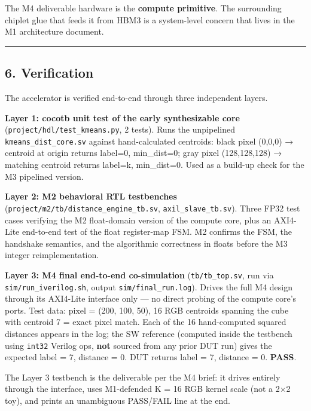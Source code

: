 \documentclass[
  10pt,
]{article}
\begin{document}
The M4 deliverable hardware is the \textbf{compute primitive}. The
surrounding chiplet glue that feeds it from HBM3 is a system-level
concern that lives in the M1 architecture document.

\begin{center}\rule{0.5\linewidth}{0.5pt}\end{center}

\hypertarget{verification}{%
\subsection{6. Verification}\label{verification}}

The accelerator is verified end-to-end through three independent layers.

\textbf{Layer 1: cocotb unit test of the early synthesizable core}
(\texttt{project/hdl/test\_kmeans.py}, 2 tests). Runs the unpipelined
\texttt{kmeans\_dist\_core.sv} against hand-calculated centroids: black
pixel (0,0,0) → centroid at origin returns label=0, min\_dist=0; gray
pixel (128,128,128) → matching centroid returns label=k, min\_dist=0.
Used as a build-up check for the M3 pipelined version.

\textbf{Layer 2: M2 behavioral RTL testbenches}
(\texttt{project/m2/tb/distance\_engine\_tb.sv},
\texttt{axil\_slave\_tb.sv}). Three FP32 test cases verifying the M2
float-domain version of the compute core, plus an AXI4-Lite end-to-end
test of the float register-map FSM. M2 confirms the FSM, the handshake
semantics, and the algorithmic correctness in floats before the M3
integer reimplementation.

\textbf{Layer 3: M4 final end-to-end co-simulation}
(\texttt{tb/tb\_top.sv}, run via \texttt{sim/run\_iverilog.sh}, output
\texttt{sim/final\_run.log}). Drives the full M4 design through its
AXI4-Lite interface only --- no direct probing of the compute core's
ports. Test data: pixel = (200, 100, 50), 16 RGB centroids spanning the
cube with centroid 7 = exact pixel match. Each of the 16 hand-computed
squared distances appears in the log; the SW reference (computed inside
the testbench using \texttt{int32} Verilog ops, \textbf{not} sourced
from any prior DUT run) gives the expected label = 7, distance = 0. DUT
returns label = 7, distance = 0. \textbf{PASS}.

The Layer 3 testbench is the deliverable per the M4 brief: it drives
entirely through the interface, uses M1-defended K = 16 RGB kernel scale
(not a 2×2 toy), and prints an unambiguous PASS/FAIL line at the end.
\end{document}
